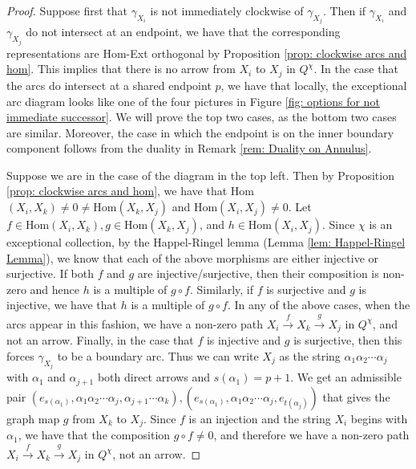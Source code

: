 \documentclass[12pt]{amsart}
\theoremstyle{plain}
\theoremstyle{definition}
\theoremstyle{remark}
\begin{document}
\begin{proof}
Suppose first that $\gamma_{X_i}$ is not immediately clockwise of $\gamma_{X_j}$. Then if $\gamma_{X_i}$ and $\gamma_{X_j}$ do not intersect at an endpoint, we have that the corresponding representations are Hom-Ext orthogonal by Proposition \ref{prop: clockwise arcs and hom}. This implies that there is no arrow from $X_i$ to $X_j$ in $Q^{\chi}$. In the case that the arcs do intersect at a shared endpoint $p$, we have that locally, the exceptional arc diagram looks like one of the four pictures in Figure \ref{fig: options for not immediate successor}. We will prove the top two cases, as the bottom two cases are similar. Moreover, the case in which the endpoint is on the inner boundary component follows from the duality in Remark \ref{rem: Duality on Annulus}.

Suppose we are in the case of the diagram in the top left. Then by Proposition \ref{prop: clockwise arcs and hom}, we have that Hom$(X_i, X_k) \neq 0 \neq \text{Hom}(X_k,X_j)$ and Hom$(X_i,X_j) \neq 0$. Let $f \in \text{Hom}(X_i, X_k), g \in \text{Hom}(X_k, X_j)$, and $h \in \text{Hom}(X_i, X_j)$. Since $\chi$ is an exceptional collection, by the Happel-Ringel lemma (Lemma \ref{lem: Happel-Ringel Lemma}), we know that each of the above morphisms are either injective or surjective. If both $f$ and $g$ are injective/surjective, then their composition is non-zero and hence $h$ is a {\color{black} multiple} of $g\circ f$. Similarly, if $f$ is surjective and $g$ is injective, we have that $h$ is a {\color{black} multiple} of $g\circ f$. In any of the above cases, when the arcs appear in this fashion, we have a non-zero path {\color{black} $X_i \overset{f}{\rightarrow} X_k \overset{g}{\rightarrow} X_j$ in $Q^{\chi}$}, and not an arrow. Finally, in the case that $f$ is injective and $g$ is surjective, then this forces $\gamma_{X_j}$ to be a boundary arc. Thus we can write $X_j$ as the string $\alpha_1 \alpha_2 \cdots \alpha_j$ with $\alpha_1$ and $\alpha_{j+1}$ both direct arrows and $s(\alpha_1) = p+1$. We get an admissible pair $(e_{s(\alpha_1)}, \alpha_1 \alpha_2 \cdots \alpha_j, \alpha_{j+1} \cdots \alpha_k),(e_{s(\alpha_1)},\alpha_1\alpha_2\cdots\alpha_j,e_{t(\alpha_j)})$ that gives the graph map $g$ from $X_k$ to $X_j$. Since $f$ is an injection and the string $X_i$ begins with $\alpha_1$, we have that the composition $g \circ f \neq 0$, and therefore we have a non-zero path {\color{black} $X_i \overset{f}{\rightarrow} X_k \overset{g}{\rightarrow} X_j$ in $Q^{\chi}$}, not an arrow.


\end{proof}
\end{document}
